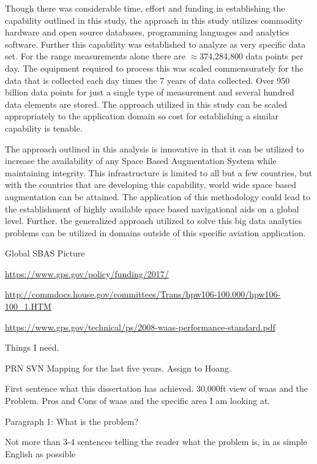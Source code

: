 Though there was considerable time, effort and funding in establishing the capability outlined in this study, the approach in this study utilizes commodity hardware and open source databases, programming languages and analytics software. Further this capability was established to analyze as very specific data set. For the range measurements alone there are $\approx$374,284,800 data points per day.  The equipment required to process this was scaled commensurately for the data that is collected each day times the 7 years of data collected. Over 950 billion data points for just a single type of measurement and several hundred data elements are stored. The approach utilized in this study can be scaled appropriately to the application domain so cost for establishing a similar capability is tenable.

The approach outlined in this analysis is innovative in that it can be utilized to increase the availability of any Space Based Augmentation System while maintaining integrity.  This infrastructure is limited to all but a few countries, but with the countries that are developing this capability, world wide space based augmentation can be attained. The application of this methodology could lead to the establishment of highly available space based navigational aids on a global level. Further. the generalized approach utilized to solve this big data analytics problems can be utilized in domains outside of this specific aviation application.

Global SBAS Picture

\href{https://www.gps.gov/policy/funding/2017/}{https://www.gps.gov/policy/funding/2017/}

\href{http://commdocs.house.gov/committees/Trans/hpw106-100.000/hpw106-100\_1.HTM}{http://commdocs.house.gov/committees/Trans/hpw106-100.000/hpw106-100\_1.HTM}

\href{https://www.gps.gov/technical/ps/2008-waas-performance-standard.pdf}{https://www.gps.gov/technical/ps/2008-waas-performance-standard.pdf}

Things I need.

PRN SVN Mapping for the last five years.
Assign to Hoang.


First sentence what this dissertation has achieved.
30,000ft view of \ac{waas} and the Problem. Pros and Cons of \ac{waas} and the specific area I am looking at.

Paragraph 1: What is the problem?

Not more than 3-4 sentences telling the reader what the problem is, in as simple English as possible

